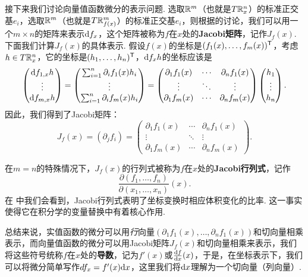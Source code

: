 接下来我们讨论向量值函数微分的表示问题. 选取$\mathbb{R}^m$（也就是$T\mathbb{R}_x^n$）的标准正交基$e_i$，选取$\mathbb{R}^m$（也就是$T\mathbb{R}^m_{f(x)}$）的标准正交基$e_i$，则根据的讨论，我们可以用一个$m\times n$的矩阵来表示$\mathrm{d} f_x$，这个矩阵被称为$f$在$x$处的\textbf{Jacobi矩阵}，记作$J_f(x)$. 下面我们计算$J_f(x)$的具体表示. 假设$f(x)$的坐标是$(f_1(x),\dots,f_m(x))^{\mathsf{T}}$，考虑$h\in T\mathbb{R}_x^n$，它的坐标是$(h_1,\dots,h_n)^{\mathsf{T}}$，$\mathrm{d} f_x h$的坐标应该是
\[\begin{pmatrix}
    \mathrm{d} f_{1,x}h \\
    \vdots \\
    \mathrm{d} f_{m,x}h
\end{pmatrix}=
\begin{pmatrix}
    \sum_{i=1}^n\partial_i f_1(x)h_i \\
    \vdots \\
    \sum_{i=1}^n\partial_i f_m(x)h_i
\end{pmatrix}=
\begin{pmatrix}
    \partial_1 f_1(x) & \cdots & \partial_n f_1(x) \\
    \vdots & \ddots & \vdots \\
    \partial_1 f_m(x) & \cdots & \partial_n f_m(x)
\end{pmatrix}
\begin{pmatrix}
    h_1 \\
    \vdots \\
    h_n
\end{pmatrix}.\]
因此，我们得到了Jacobi矩阵：
\[J_f(x)=(\partial_j f_i)=\begin{pmatrix}
    \partial_1 f_1(x) & \cdots & \partial_n f_1(x) \\
    \vdots & \ddots & \vdots \\
    \partial_1 f_m(x) & \cdots & \partial_n f_m(x)
\end{pmatrix}.\]

在$m=n$的特殊情况下，$J_f(x)$的行列式被称为$f$在$x$处的\textbf{Jacobi行列式}，记作
\[\frac{\partial(f_1,\dots,f_n)}{\partial(x_1,\dots,x_n)}(x).\]
在 中我们会看到，Jacobi行列式表明了坐标变换时相应体积变化的比率. 这一事实使得它在积分学的变量替换中有着核心作用. 

总结来说，实值函数的微分可以用\emph{行}向量$(\partial_1 f_1(x),\dots,\partial_n f_1(x))$和切向量相乘表示，而向量值函数的微分可以用Jacobi矩阵$J_f(x)$和切向量相乘来表示，我们将这些符号统称$f$在$x$处的\textbf{导数}，记为$f'(x)$或$\frac{\mathrm{d} f}{\mathrm{d} x}(x)$，于是，在坐标表示下，我们可以将微分简单写作$df_x=f'(x)\mathrm{d} x$，这里我们将$\mathrm{d} x$理解为一个切向量（列向量）. 

